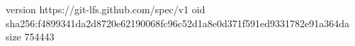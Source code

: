 version https://git-lfs.github.com/spec/v1
oid sha256:f4899341da2d8720e62190068fc96c52d1a8e0d371f591ed9331782e91a364da
size 754443
